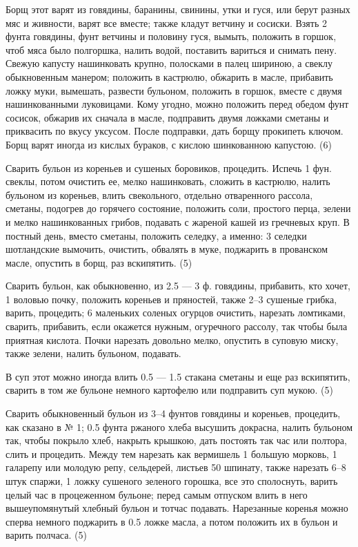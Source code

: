 
Борщ этот варят из говядины, баранины, свинины, утки и гуся, или берут разных мяс и живности, варят все вместе; также кладут ветчину и сосиски. Взять 2 фунта говядины, фунт ветчины и половину гуся, вымыть, положить в горшок, чтоб мяса было полгоршка, налить водой, поставить вариться и снимать пену. Свежую капусту нашинковать крупно, полосками в палец шириною, а свеклу обыкновенным манером; положить в кастрюлю, обжарить в масле, прибавить ложку муки, вымешать, развести бульоном, положить в горшок, вместе с двумя нашинкованными луковицами. Кому угодно, можно положить перед обедом фунт сосисок, обжарив их сначала в масле, подправить двумя ложками сметаны и приквасить по вкусу уксусом. После подправки, дать борщу прокипеть ключом. Борщ варят иногда из кислых бураков, с кислою шинкованною капустою. (6)


Сварить бульон из кореньев и сушеных боровиков, процедить. Испечь 1 фун. свеклы, потом очистить ее, мелко нашинковать, сложить в кастрюлю, налить бульоном из кореньев, влить свекольного, отдельно отваренного рассола, сметаны, подогрев до горячего состояние, положить соли, простого перца, зелени и мелко нашинкованных грибов, подавать с жареной кашей из гречневых круп.
В постный день, вместо сметаны, положить селедку, а именно: 3 селедки шотландские вымочить, очистить, обвалять в муке, поджарить в прованском масле, опустить в борщ, раз вскипятить. (5)


Сварить бульон, как обыкновенно, из 2.5 — 3 ф. говядины, прибавить, кто хочет, 1 воловью почку, положить кореньев и пряностей, также 2–3 сушеные грибка, варить, процедить; 6 маленьких соленых огурцов очистить, нарезать ломтиками, сварить, прибавить, если окажется нужным, огуречного рассолу, так чтобы была приятная кислота. Почки нарезать довольно мелко, опустить в суповую миску, также зелени, налить бульоном, подавать.

В суп этот можно иногда влить 0.5 — 1.5 стакана сметаны и еще раз вскипятить, сварить в том же бульоне немного картофелю или подправить суп мукою. (5)


Сварить обыкновенный бульон из 3–4 фунтов говядины и кореньев, процедить, как сказано в № 1; 0.5 фунта ржаного хлеба высушить докрасна, налить бульоном так, чтобы покрыло хлеб, накрыть крышкою, дать постоять так час или полтора, слить и процедить. Между тем нарезать как вермишель 1 большую морковь, 1 галарепу или молодую репу, сельдерей, листьев 50 шпинату, также нарезать 6–8 штук спаржи, 1 ложку сушеного зеленого горошка, все это сполоснуть, варить целый час в процеженном бульоне; перед самым отпуском влить в него вышеупомянутый хлебный бульон и тотчас подавать. Нарезанные коренья можно сперва немного поджарить в 0.5 ложке масла, а потом положить их в бульон и варить полчаса. (5)

